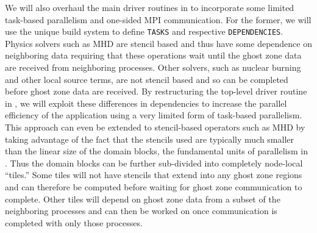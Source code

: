

We will also overhaul the main driver routines in \flash to incorporate some limited task-based parallelism and one-sided MPI communication.
For the former, we will use the unique \flash build system to define {\tt TASKS} and respective {\tt DEPENDENCIES}.
Physics solvers such as MHD are stencil based and thus have some dependence on neighboring data requiring that these operations wait until the ghost zone data are received from neighboring processes.
Other solvers, such as nuclear burning and other local source terms, are not stencil based and so can be completed before ghost zone data are received.
By restructuring the top-level driver routine in \flash, we will exploit these differences in dependencies to increase the parallel efficiency of the application using a very limited form of task-based parallelism.
This approach can even be extended to stencil-based operators such as MHD by taking advantage of the fact that the stencils used are typically much smaller than the linear size of the domain blocks, the fundamental units of parallelism in \flash.
Thus the domain blocks can be further sub-divided into completely node-local ``tiles.''
Some tiles will not have stencils that extend into any ghost zone regions and can therefore be computed before waiting for ghost zone communication to complete.
Other tiles will depend on ghost zone data from a subset of the neighboring processes and can then be worked on once communication is completed with only those processes.


